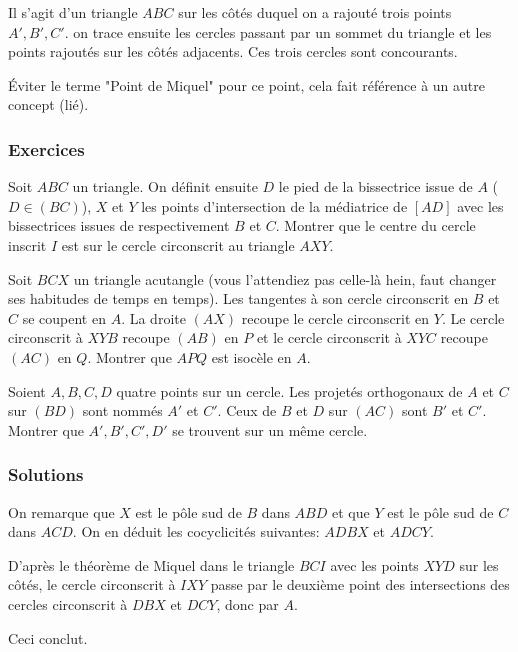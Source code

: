 Il s'agit d'un triangle $ABC$ sur les côtés duquel on a rajouté trois points $A',B',C'$. on trace ensuite les cercles passant par un sommet du triangle et les points rajoutés sur les côtés adjacents. Ces trois cercles sont concourants. 

Éviter le terme "Point de Miquel" pour ce point, cela fait référence à un autre concept (lié).


\subsubsection{Exercices}


\begin{exo}
Soit $ABC$ un triangle. On définit ensuite $D$ le pied de la bissectrice issue de $A$ ($D\in(BC)$), $X$ et $Y$ les points d'intersection de la médiatrice de $[AD]$ avec les bissectrices issues de respectivement $B$ et $C$. Montrer que le centre du cercle inscrit $I$ est sur le cercle circonscrit au triangle $AXY$.
\end{exo}


\begin{exo}
Soit $BCX$ un triangle acutangle (vous l'attendiez pas celle-là hein, faut changer ses habitudes de temps en temps). Les tangentes à son cercle circonscrit en $B$ et $C$ se coupent en $A$. La droite $(AX)$ recoupe le cercle circonscrit en $Y$. Le cercle circonscrit à $XYB$ recoupe $(AB)$ en $P$ et le cercle circonscrit à $XYC$ recoupe $(AC)$ en $Q$. Montrer que $APQ$ est isocèle en $A$.
\end{exo}


\begin{exo}
Soient $A,B,C,D$ quatre points sur un cercle. Les projetés orthogonaux de $A$ et $C$ sur $(BD)$ sont nommés $A'$ et $C'$. Ceux de $B$ et $D$ sur $(AC)$ sont $B'$ et $C'$. Montrer que $A',B',C',D'$ se trouvent sur un même cercle.
\end{exo}


\subsubsection{Solutions}


\begin{sol}
On remarque que $X$ est le pôle sud de $B$ dans $ABD$ et que $Y$ est le pôle sud de $C$ dans $ACD$. On en déduit les cocyclicités suivantes: $ADBX$ et $ADCY$.

D'après le théorème de Miquel dans le triangle $BCI$ avec les points $XYD$ sur les côtés, le cercle circonscrit à $IXY$ passe par le deuxième point des intersections des cercles circonscrit à $DBX$ et $DCY$, donc par $A$.

Ceci conclut.
\end{sol}


